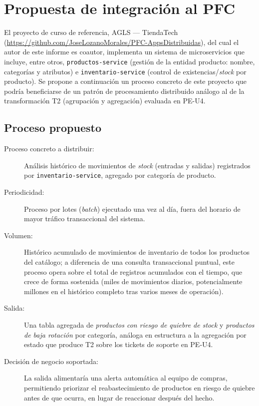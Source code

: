 \documentclass[11pt,a4paper]{article}
\begin{document}

    \section{Propuesta de integración al PFC}
    \label{sec:propuesta-pfc}

    El proyecto de curso de referencia, AGLS --- TiendaTech
    (\url{https://github.com/JoseLozanoMorales/PFC-AppsDistribuidas}), del
    cual el autor de este informe es coautor, implementa un sistema de
    microservicios que incluye, entre otros, \texttt{productos-service}
    (gestión de la entidad producto: nombre, categorías y atributos) e
    \texttt{inventario-service} (control de existencias/\emph{stock} por
    producto). Se propone a continuación un proceso concreto de este
    proyecto que podría beneficiarse de un patrón de procesamiento
    distribuido análogo al de la transformación T2 (agrupación y
    agregación) evaluada en PE-U4.

    \subsection{Proceso propuesto}

    \begin{description}
        \item[Proceso concreto a distribuir:] Análisis histórico de
        movimientos de \emph{stock} (entradas y salidas) registrados por
        \texttt{inventario-service}, agregado por categoría de producto.
        \item[Periodicidad:] Proceso por lotes (\emph{batch}) ejecutado una
        vez al día, fuera del horario de mayor tráfico transaccional del
        sistema.
        \item[Volumen:] Histórico acumulado de movimientos de inventario
        de todos los productos del catálogo; a diferencia de una consulta
        transaccional puntual, este proceso opera sobre el total de
        registros acumulados con el tiempo, que crece de forma sostenida
        (miles de movimientos diarios, potencialmente millones en el
        histórico completo tras varios meses de operación).
        \item[Salida:] Una tabla agregada de \emph{productos con riesgo de
        quiebre de stock} y \emph{productos de baja rotación} por
        categoría, análoga en estructura a la agregación por estado que
        produce T2 sobre los tickets de soporte en PE-U4.
        \item[Decisión de negocio soportada:] La salida alimentaría una
        alerta automática al equipo de compras, permitiendo priorizar el
        reabastecimiento de productos en riesgo de quiebre antes de que
        ocurra, en lugar de reaccionar después del hecho.
    \end{description}
\end{document}
